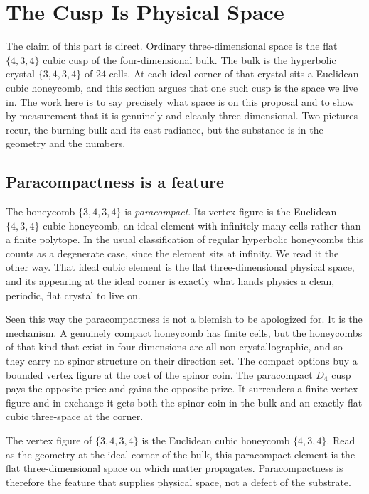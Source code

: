 \section{The Cusp Is Physical Space}

The claim of this part is direct. Ordinary three-dimensional space is the flat $\{4,3,4\}$ cubic cusp of the
four-dimensional bulk. The bulk is the hyperbolic crystal $\{3,4,3,4\}$ of $24$-cells. At each ideal corner of
that crystal sits a Euclidean cubic honeycomb, and this section argues that one such cusp is the space we live
in. The work here is to say precisely what space is on this proposal and to show by measurement that it is
genuinely and cleanly three-dimensional. Two pictures recur, the burning bulk and its cast radiance, but the
substance is in the geometry and the numbers.

\subsection{Paracompactness is a feature}

The honeycomb $\{3,4,3,4\}$ is \emph{paracompact}. Its vertex figure is the Euclidean $\{4,3,4\}$ cubic
honeycomb, an ideal element with infinitely many cells rather than a finite polytope. In the usual classification
of regular hyperbolic honeycombs this counts as a degenerate case, since the element sits at infinity. We read it
the other way. That ideal cubic element is the flat three-dimensional physical space, and its appearing at the
ideal corner is exactly what hands physics a clean, periodic, flat crystal to live on.

Seen this way the paracompactness is not a blemish to be apologized for. It is the mechanism. A genuinely compact
honeycomb has finite cells, but the honeycombs of that kind that exist in four dimensions are all
non-crystallographic, and so they carry no spinor structure on their direction set. The compact options buy a
bounded vertex figure at the cost of the spinor coin. The paracompact $D_4$ cusp pays the opposite price and
gains the opposite prize. It surrenders a finite vertex figure and in exchange it gets both the spinor coin in
the bulk and an exactly flat cubic three-space at the corner.

\begin{proposition}
The vertex figure of $\{3,4,3,4\}$ is the Euclidean cubic honeycomb $\{4,3,4\}$. Read as the geometry at the
ideal corner of the bulk, this paracompact element is the flat three-dimensional space on which matter
propagates. Paracompactness is therefore the feature that supplies physical space, not a defect of the
substrate.
\end{proposition}

